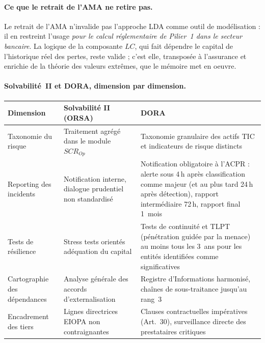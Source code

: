 \paragraph{Ce que le retrait de l'AMA ne retire pas.} Le retrait de l'AMA n'invalide pas
l'approche LDA comme outil de modélisation : il en restreint l'usage \emph{pour le calcul
réglementaire de Pilier~1 dans le secteur bancaire}. La logique de la composante $LC$, qui fait
dépendre le capital de l'historique réel des pertes, reste valide ; c'est elle, transposée à
l'assurance et enrichie de la théorie des valeurs extrêmes, que le mémoire met en oeuvre.


\paragraph{Solvabilité~II et DORA, dimension par dimension.}

\begin{center}
\renewcommand{\arraystretch}{1.3}
\begin{tabular}{>{\raggedright}p{3cm} >{\raggedright}p{5cm} >{\raggedright\arraybackslash}p{5.5cm}}
\toprule
\rowcolor{lightblue}
\textbf{Dimension} & \textbf{Solvabilité II (ORSA)} & \textbf{DORA} \\
\midrule
Taxonomie du risque & Traitement agrégé dans le module $SCR_{Op}$ &
Taxonomie granulaire des actifs TIC et indicateurs de risque distincts \\
Reporting des incidents & Notification interne, dialogue prudentiel non standardisé &
Notification obligatoire à l'ACPR : alerte sous 4\,h après classification comme majeur
(et au plus tard 24\,h après détection), rapport intermédiaire 72\,h,
rapport final 1~mois \\
Tests de résilience & Stress tests orientés adéquation du capital &
Tests de continuité et TLPT (pénétration guidée par la menace) au moins tous les 3~ans
pour les entités identifiées comme significatives \\
Cartographie des dépendances & Analyse générale des accords d'externalisation &
Registre d'Informations harmonisé, chaînes de sous-traitance jusqu'au rang~3 \\
Encadrement des tiers & Lignes directrices EIOPA non contraignantes &
Clauses contractuelles impératives (Art.~30), surveillance directe des prestataires
critiques \\
\bottomrule
\end{tabular}
\end{center}


